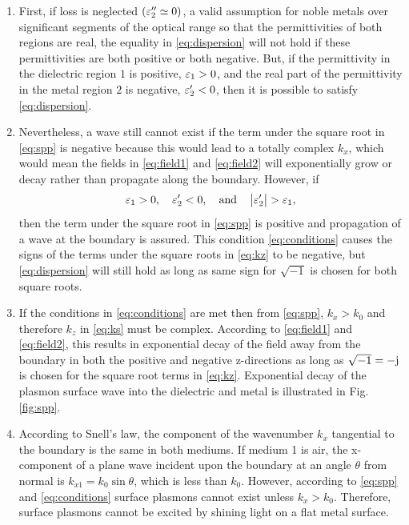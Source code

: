 \documentclass[11pt]{article}
\begin{document}
\begin{enumerate}
  \item First, if loss is neglected $(\varepsilon_2'' \simeq 0)$, a valid assumption for noble metals over significant segments of the optical range so that the permittivities of both regions are real, the equality in \eqref{eq:dispersion} will not hold if these permittivities are both positive or both negative. But, if the permittivity in the dielectric region $1$ is positive, $\varepsilon_1 > 0$, and the real part of the permittivity in the metal region $2$ is negative, $\varepsilon_2' < 0$, then it is possible to satisfy \eqref{eq:dispersion}.
  \item	Nevertheless, a wave still cannot exist if the term under the square root in \eqref{eq:spp} is negative because this would lead to a totally complex $k_x$, which would mean the fields in \eqref{eq:field1} and \eqref{eq:field2} will exponentially grow or decay rather than propagate along the boundary. However, if
  \begin{equation}
    \varepsilon_1 > 0, \quad		 \varepsilon_2' < 0, \quad   \text{and}  \quad \left| \varepsilon_2' \right| > \varepsilon_1,
    \label{eq:conditions}
  \end{equation}
  then the term under the square root in \eqref{eq:spp} is positive and propagation of a wave at the boundary is assured. This condition \eqref{eq:conditions} causes the signs of the terms under the square roots in \eqref{eq:kz} to be negative, but \eqref{eq:dispersion} will still hold as long as same sign for $\sqrt{-1}$ is chosen for both square roots.
  \item	If the conditions in \eqref{eq:conditions} are met then from \eqref{eq:spp}, $k_x > k_0$ and therefore $k_z$ in \eqref{eq:ks} must be complex. According to \eqref{eq:field1} and \eqref{eq:field2}, this results in exponential decay of the field away from the boundary in both the positive and negative z-directions as long as $\sqrt{-1} = -\mathrm{j}\mkern1mu$ is chosen for the square root terms in \eqref{eq:kz}. Exponential decay of the plasmon surface wave into the dielectric and metal is illustrated in Fig. \ref{fig:spp}.
  \item	According to Snell's law, the component of the wavenumber $k_x$ tangential to the boundary is the same in both mediums. If medium 1 is air, the x-component of a plane wave incident upon the boundary at an angle $\theta$ from normal is $k_{x1} = k_0 \sin \theta$, which is less than $k_0$. However, according to \eqref{eq:spp} and \eqref{eq:conditions} surface plasmons cannot exist unless $k_x > k_0$. Therefore, surface plasmons cannot be excited by shining light on a flat metal surface.

\end{enumerate}
\end{document}
